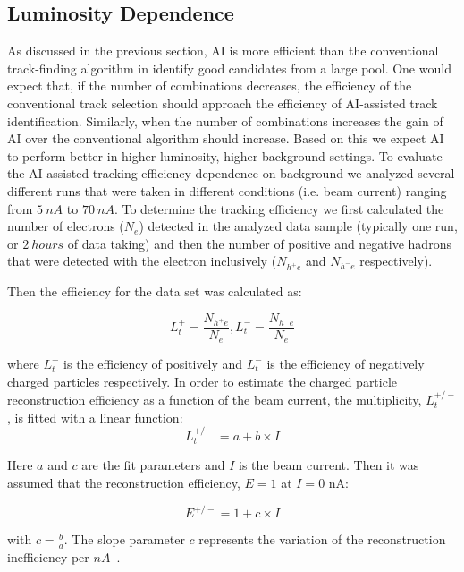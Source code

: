 \subsection{Luminosity Dependence}

As discussed in the previous section, AI is more efficient than the conventional track-finding 
algorithm in identify good candidates from a large pool. One would expect that, if the number 
of combinations decreases, the efficiency of the conventional track selection should approach the 
efficiency of AI-assisted track identification. Similarly, when the number of combinations 
increases the gain of AI over the conventional algorithm should increase. Based on this we 
expect AI to perform better in higher luminosity, higher background settings. To evaluate the 
AI-assisted tracking efficiency dependence on background we analyzed several different runs 
that were taken in different conditions (i.e. beam current) ranging from $5~nA$ to $70~nA$. 
To determine the tracking efficiency we first calculated the number of electrons ($N_e$) detected 
in the analyzed data sample (typically one run, or $2~hours$ of data taking) and then the number of 
positive and negative hadrons that were detected with the electron inclusively ($N_{h^+e}$ and 
$N_{h^-e}$ respectively).

Then the efficiency for the data set was calculated as:

\begin{equation}
L_t^+ = \frac{N_{h^+e}}{N_e} , L_t^- = \frac{N_{h^-e}}{N_e} 
\end{equation}

where $L_t^+$ is the efficiency of positively and $L_t^-$ is the efficiency of negatively 
charged particles respectively. In order to estimate the charged particle reconstruction efficiency 
as a function of the beam current, the multiplicity, $L_t^{+/-}$, is fitted with a linear function:
\begin{equation}
L_t^{+/-} = a + b\times I 
\end{equation}

Here $a$ and $c$ are the fit parameters and $I$ is the beam current. Then it was assumed that the 
reconstruction efficiency, $E=1$ at $I=0$ nA:

\begin{equation}
E^{+/-} = 1 + c \times I 
\end{equation}

with $c=\frac{b}{a}$. The slope parameter $c$ represents the variation of the reconstruction 
inefficiency per $nA$~\cite{Stepanyan:2020bg}.
 
